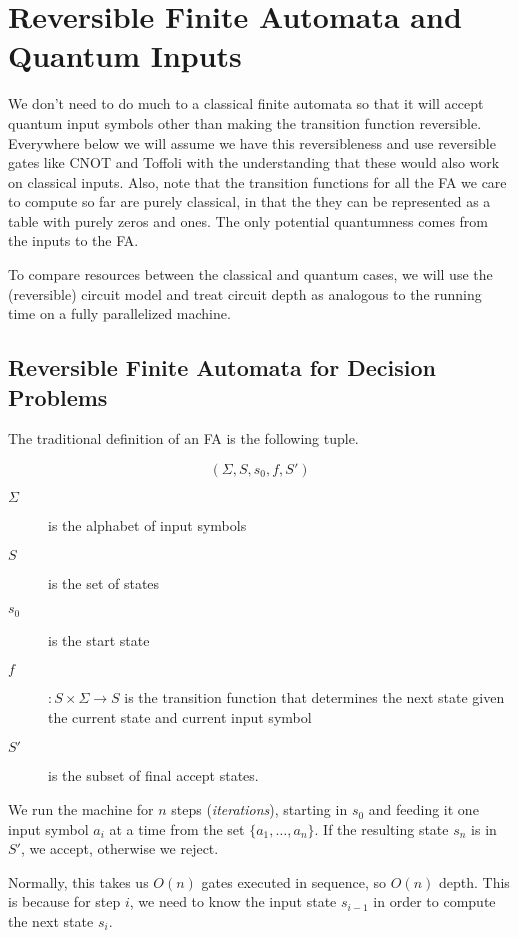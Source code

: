 \section{Reversible Finite Automata and Quantum Inputs}

We don't need to do much to a classical finite automata so that it will
accept quantum input symbols other than making the transition function
reversible. Everywhere below we will assume we have this reversibleness and
use reversible gates like CNOT and Toffoli with the understanding that these
would also work on classical inputs. Also, note that the transition functions
for all the FA we care to compute so far are purely classical, in that the
they can be represented as a table with purely zeros and ones. The only
potential quantumness comes from the inputs to the FA.

To compare resources
between the classical and quantum cases, we will use the (reversible) circuit
model and treat circuit depth as analogous to the running time on a fully
parallelized machine.

\subsection{Reversible Finite Automata for Decision Problems}

The traditional definition of an FA is the following tuple.

\begin{displaymath}
(\Sigma,S,s_0,f,S')
\end{displaymath}

\begin{description}
\item[$\Sigma$] is the alphabet of input symbols
\item[$S$] is the set of states
\item[$s_0$] is the start state
\item[$f$] $: S \times \Sigma \rightarrow S$ is the
transition function that determines the next state given the current state
and current input symbol
\item[$S'$] is the subset of final accept states.
\end{description}

We run the machine for $n$ steps (\emph{iterations}),
starting in $s_0$ and feeding it one
input symbol $a_i$ at a time from the set $\{a_1,\ldots,a_n\}$.
If the resulting state $s_n$ is
in $S'$, we accept, otherwise we reject.

Normally, this takes us $O(n)$ gates executed in sequence, so $O(n)$ depth.
This is because for step $i$, we need to know the input state $s_{i-1}$ in
order to compute the next state $s_i$.

